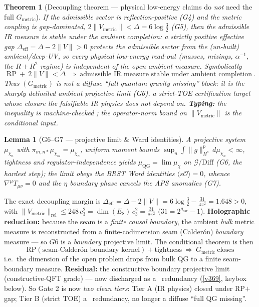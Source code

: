 \documentclass[11pt,a4paper]{article}
\newcommand{\cthree}{c_3}
\newcommand{\gcar}{g_{\mathrm{car}}}
\newtheorem{lemma}{Lemma}
\newtheorem{theorem}{Theorem}
\begin{document}
\begin{theorem}[Decoupling theorem --- physical low-energy claims do \emph{not} need the full $G_{\mathrm{metric}}$]
\emph{If} the admissible sector is reflection-positive (G4) and the metric coupling is gap-dominated,
$2\|V_{\mathrm{metric}}\|<\Delta=6\log\tfrac32$ (G5), \emph{then} the admissible IR measure is stable under
the ambient completion: a strictly positive effective gap $\Delta_{\mathrm{eff}}=\Delta-2\|V\|>0$ protects the
admissible sector from the (un-built) ambient/deep-UV, so every \emph{physical low-energy} read-out (masses,
mixings, $\alpha^{-1}$, the $R{+}R^2$ regime) is independent of the open ambient measure. Symbolically
\[
  \boxed{\ \mathrm{RP}\ +\ 2\|V\|<\Delta\ \Longrightarrow\ \text{admissible IR measure stable under ambient completion}\ .}
\]
Thus $(G_{\mathrm{metric}})$ is \emph{not} a diffuse ``full quantum gravity missing'' block: it is the sharply
delimited \emph{ambient projective limit} (G6), a strict-TOE certification target whose closure the
falsifiable IR physics does not depend on. \textbf{Typing:} the inequality is machine-checked \mE; the
operator-norm bound on $\|V_{\mathrm{metric}}\|$ is the conditional input.
\end{theorem}

\begin{lemma}[G6--G7 --- projective limit \& Ward identities]
A projective system $\mu_{\chi_n}$ with $\pi_{m,n*}\mu_{\chi_m}=\mu_{\chi_n}$, uniform moment bounds
$\sup_n\!\int\|g\|_{H^s}^p\,d\mu_{\chi_n}<\infty$, tightness and regulator-independence yields
$\mu_{\mathrm{QG}}=\lim\mu_\chi$ on $\mathcal G/\mathrm{Diff}$ (G6, the hardest step); the limit obeys the
BRST Ward identities $\langle s\mathcal O\rangle=0$, whence $\nabla^\mu T_{\mu\nu}=0$ and the $\eta$
boundary phase cancels the APS anomalies (G7).
\end{lemma}

\begin{keybox}
The exact decoupling margin is $\Delta_{\mathrm{eff}}=\Delta-2\|V\|=6\log\tfrac32-\tfrac{31}{4\pi^2}=1.648>0$,
with $\|V_{\mathrm{metric}}\|_{\mathrm{rel}}\le248\,\cthree^2=\dim(E_8)\,\cthree^2=\tfrac{31}{8\pi^2}$
($31=2^{\gcar}-1$). \textbf{Holographic reduction:} because the seam is a \emph{finite causal boundary}, the
ambient \emph{bulk} metric measure is reconstructed from a finite-codimension seam (Calder\'on) \emph{boundary}
measure --- so $G6$ is a \emph{boundary} projective limit. The conditional theorem is then
\[
  \boxed{\ \mathrm{RP}(\text{seam-Calder\'on boundary kernel})+\text{tightness}\ \Longrightarrow\ G_{\mathrm{metric}}\ \text{closes}\ }
\]
i.e.\ the dimension of the open problem drops from bulk QG to a finite seam-boundary measure. \textbf{Residual:}
the constructive boundary projective limit (constructive-QFT grade) --- now discharged as a \mC\ redundancy
(\vref{v369}, keybox below). So Gate 2 is now
\emph{two clean tiers}: Tier A (IR physics) closed under RP$+$gap; Tier B (strict TOE) a \mC\ redundancy, no
longer a diffuse ``full QG missing''. \mC
\end{keybox}
\end{document}
